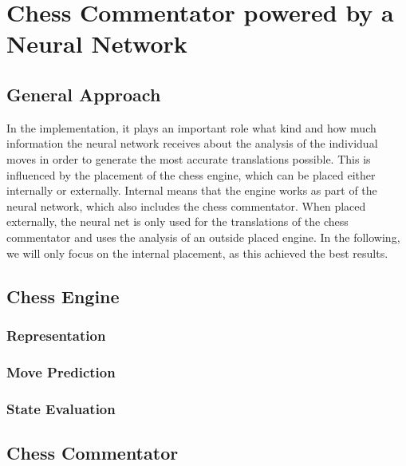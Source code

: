 \section{Chess Commentator powered by a Neural Network}

\subsection{General Approach}

In the implementation, it plays an important role what kind and how much information the neural network receives about the analysis of the individual moves in order to generate the most accurate translations possible. This is influenced by the placement of the chess engine, which can be placed either internally or externally. Internal means that the engine works as part of the neural network, which also includes the chess commentator. When placed externally, the neural net is only used for the translations of the chess commentator and uses the analysis of an outside placed engine. In the following, we will only focus on the internal placement, as this achieved the best results.

\subsection{Chess Engine}

\subsubsection{Representation}

\subsubsection{Move Prediction}

\subsubsection{State Evaluation}

\subsection{Chess Commentator}